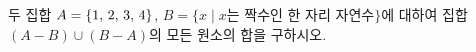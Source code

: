 두 집합 $A=\{1,\mkern3mu 2,\mkern3mu 3,\mkern3mu 4\}$, $B=\{x \mid x$는 짝수인 한 자리 자연수$\}$에 대하여 집합 $(A-B)\cup(B-A)$의 모든 원소의 합을 구하시오.
